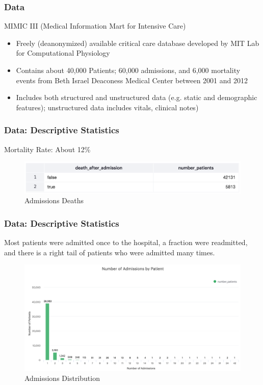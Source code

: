 \documentclass{beamer}
\begin{document}
\begin{frame}
\label{Data}
\frametitle{Data}
MIMIC III (Medical Information Mart for Intensive Care)
\begin{itemize}
\item Freely (deanonymized) available critical care database developed by MIT Lab for Computational Physiology
\item Contains about 40,000 Patients; 60,000 admissions, and 6,000 mortality events from Beth Israel Deaconess Medical Center between 2001 and 2012
\item Includes both structured and unstructured data (e.g. static and demographic features); unstructured data includes vitals, clinical notes)
\end{itemize}
\end{frame}

\begin{frame}
\label{Data: Descriptive Statistics}
\frametitle{Data: Descriptive Statistics}
Mortality Rate: About 12\%

\begin{figure}[H]
\centering
\caption{Admissions Deaths}
\label{AdmissionsDeaths}
\includegraphics[page = {1}, scale = 0.4]{./images/admissions-deaths.png}
\end{figure}
\end{frame}

\begin{frame}
\frametitle{Data: Descriptive Statistics}
Most patients were admitted once to the hospital, a fraction were readmitted, and there is a right tail of patients who were admitted many times.

\begin{figure}[H]
\centering
\caption{Admissions Distribution}
\label{AdmissionsDistribution}
\includegraphics[page = {1}, scale = 0.2]{./images/admissions-distribution.png}
\end{figure}
\end{frame}
\end{document}
